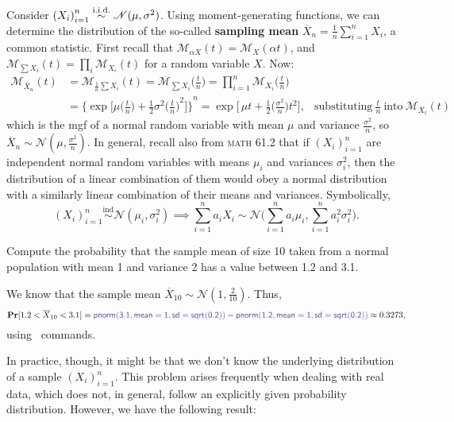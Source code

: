 Consider \({(X_i)}_{i=1}^n \stackrel{\mathrm{i.i.d.}}{\sim} \mathscr{N}(\mu, \sigma^2)\). 
Using moment-generating functions, we can determine the distribution of the so-called \textbf{sampling mean} \(\overline{X}_n = \frac{1}{n}\sum_{i=1}^n X_i\), a common statistic. 
First recall that \(\mathscr{M}_{\alpha X}(t) = \mathscr{M}_X(\alpha t)\), and \(\mathscr{M}_{\sum X_i}(t) = \prod_i \mathscr{M}_{X_i}(t)\) for a random variable \(X\). Now:\begin{align*}
    \mathscr{M}_{\overline{X}_n}(t) &= \mathscr{M}_{\frac{1}{n}\sum X_i}(t) = \mathscr{M}_{\sum X_i} \bigl(\tfrac{t}{n}\bigr) = \prod_{i=1}^n \mathscr{M}_{X_i} \big(\tfrac{t}{n}\big) \\
    &= {\biggl\{ \exp\bigg[\mu \biggl(\frac{t}{n}\bigg) + \frac{1}{2}\sigma^2 {\biggl(\frac{t}{n}\bigg)}^2\bigg]\biggr\} }^n = \exp \bigg[\, \mu t + \frac{1}{2}\biggl(\frac{\sigma^2}{n}\bigg)t^2\bigg],&\text{substituting}~\frac{t}{n}~\text{into}~\mathscr{M}_{X_i}(t)
\end{align*}which is the mgf of a normal random variable with mean \(\mu\) and variance \(\frac{\sigma^2}{n}\), so \(\overline{X}_n \sim \mathscr{N}(\mu, \frac{\sigma^2}{n})\). 
In general, recall also from \textsc{math} 61.2 that if \({(X_i)}_{i=1}^n\) are independent normal random variables with means \(\mu_i\) and variances \(\sigma_i^2\), then the distribution of a linear combination of them would obey a normal distribution with a similarly linear combination of their means and variances. 
Symbolically,\[
    {(X_i)}_{i=1}^n \overset{\mathrm{ind}}{\sim} \mathscr{N} (\mu_i, \sigma_i^2) \implies \sum_{i=1}^n a_i X_i \sim \mathscr{N}\Big(\sum_{i=1}^n a_i \mu_i, \sum_{i=1}^n a_i^2 \sigma_i^2\Big). 
\]

\begin{example}
    Compute the probability that the sample mean of size 10 taken from a normal population with mean 1 and variance 2 has a value between 1.2 and 3.1. 

    We know that the sample mean \(\overline{X}_{10} \sim \mathscr{N}(1, \frac{2}{10})\). 
    Thus,\[
    \Pr [1.2 <\overline{X}_{10} <3.1] = \code{pnorm(3.1, mean=1, sd=sqrt(0.2))} - \code{pnorm(1.2, mean=1, sd=sqrt(0.2))} \approx 0.3273,\]
    using \R~commands. 
\end{example}

In practice, though, it might be that we don't know the underlying distribution of a sample \({(X_i)}_{i=1}^n\). 
This problem arises frequently when dealing with real data, which does not, in general, follow an explicitly given probability distribution. 
However, we have the following result: 


